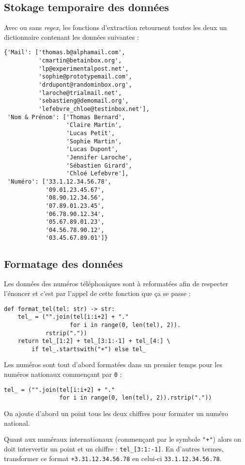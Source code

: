 \subsection*{Stokage temporaire des données}
Avec ou sans \textit{regex}, les fonctions d'extraction retournent toutes les deux un dictionnaire contenant les données suivantes :
\begin{verbatim}
{'Mail': ['thomas.b@alphamail.com',
          'cmartin@betainbox.org',
          'lp@experimentalpost.net',
          'sophie@prototypemail.com',
          'drdupont@randominbox.org',
          'laroche@trialmail.net',
          'sebastieng@demomail.org',
          'lefebvre_chloe@testinbox.net'],
 'Nom & Prénom': ['Thomas Bernard',
                  'Claire Martin',
                  'Lucas Petit',
                  'Sophie Martin',
                  'Lucas Dupont',
                  'Jennifer Laroche',
                  'Sébastien Girard',
                  'Chloé Lefebvre'],
 'Numéro': ['33.1.12.34.56.78',
            '09.01.23.45.67',
            '08.90.12.34.56',
            '07.89.01.23.45',
            '06.78.90.12.34',
            '05.67.89.01.23',
            '04.56.78.90.12',
            '03.45.67.89.01']}
\end{verbatim}
\medskip

\subsection*{Formatage des données}
Les données des numéros téléphoniques sont à reformatées afin de respecter l'énoncer et c'est par l'appel de cette fonction que ça se passe :
\begin{lstlisting}
def format_tel(tel: str) -> str:
    tel_ = ("".join(tel[i:i+2] + "."
                   for i in range(0, len(tel), 2)).
            rstrip("."))
    return tel_[1:2] + tel_[3:1:-1] + tel_[4:] \
        if tel_.startswith("+") else tel_
\end{lstlisting}
\medskip

Les numéros sont tout d'abord formatées dans un premier temps pour les numéros nationaux commençant par \texttt{0} :
\begin{lstlisting}
tel_ = ("".join(tel[i:i+2] + "."
                for i in range(0, len(tel), 2)).rstrip("."))
\end{lstlisting}
\medskip

On ajoute d'abord un point tous les deux chiffres pour formater un numéro national.
\medskip

Quant aux numéraux internationaux (commençant par le symbole \texttt{"+"}) alors on doit intervertir un point et un chiffre : \texttt{tel\_[3:1:-1]}. En d'autres termes, transformer ce format \texttt{+3.31.12.34.56.78} en celui-ci \texttt{33.1.12.34.56.78}.
\medskip

